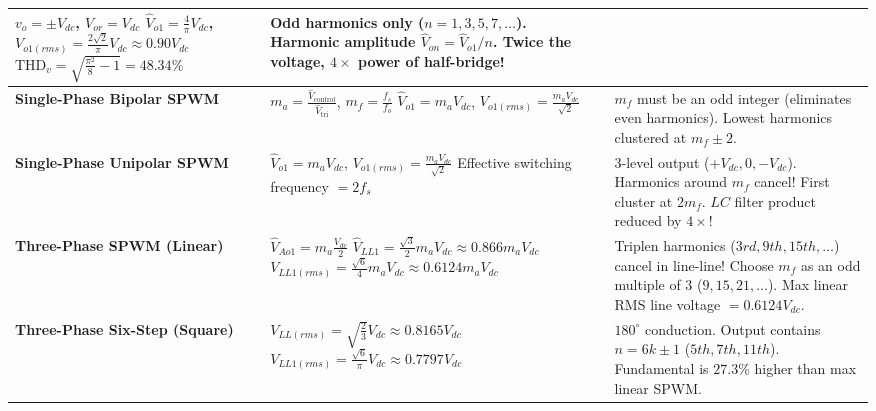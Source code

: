 \documentclass[11pt,a4paper]{article}
\begin{document}
\begin{table}[htbp]
\begin{tabularx}{\textwidth}{l p{5.5cm} X}
$v_o = \pm V_{dc}$, \quad $V_{or} = V_{dc}$ \newline
$\hat{V}_{o1} = \frac{4}{\pi}V_{dc}$, \quad $V_{o1(rms)} = \frac{2\sqrt{2}}{\pi}V_{dc} \approx 0.90 V_{dc}$ \newline
$\text{THD}_v = \sqrt{\frac{\pi^2}{8}-1} = 48.34\%$ &
Odd harmonics only ($n=1, 3, 5, 7, \dots$). \newline
Harmonic amplitude $\hat{V}_{on} = \hat{V}_{o1}/n$. \newline
Twice the voltage, $4\times$ power of half-bridge! \\
\midrule
\textbf{Single-Phase Bipolar SPWM} &
$m_a = \frac{\hat{V}_{\text{control}}}{\hat{V}_{\text{tri}}}$, \quad $m_f = \frac{f_s}{f_o}$ \newline
$\hat{V}_{o1} = m_a V_{dc}$, \quad $V_{o1(rms)} = \frac{m_a V_{dc}}{\sqrt{2}}$ &
$m_f$ must be an odd integer (eliminates even harmonics). \newline
Lowest harmonics clustered at $m_f \pm 2$. \\
\midrule
\textbf{Single-Phase Unipolar SPWM} &
$\hat{V}_{o1} = m_a V_{dc}$, \quad $V_{o1(rms)} = \frac{m_a V_{dc}}{\sqrt{2}}$ \newline
Effective switching frequency $= 2f_s$ &
3-level output ($+V_{dc}, 0, -V_{dc}$). \newline
Harmonics around $m_f$ cancel! First cluster at $2m_f$. \newline
$LC$ filter product reduced by $4\times$! \\
\midrule
\textbf{Three-Phase SPWM (Linear)} &
$\hat{V}_{Ao1} = m_a \frac{V_{dc}}{2}$ \newline
$\hat{V}_{LL1} = \frac{\sqrt{3}}{2} m_a V_{dc} \approx 0.866 m_a V_{dc}$ \newline
$V_{LL1(rms)} = \frac{\sqrt{6}}{4} m_a V_{dc} \approx 0.6124 m_a V_{dc}$ &
Triplen harmonics ($3rd, 9th, 15th, \dots$) cancel in line-line! \newline
Choose $m_f$ as an odd multiple of 3 ($9, 15, 21, \dots$). \newline
Max linear RMS line voltage $= 0.6124 V_{dc}$. \\
\midrule
\textbf{Three-Phase Six-Step (Square)} &
$V_{LL(rms)} = \sqrt{\frac{2}{3}}V_{dc} \approx 0.8165 V_{dc}$ \newline
$V_{LL1(rms)} = \frac{\sqrt{6}}{\pi}V_{dc} \approx 0.7797 V_{dc}$ &
$180^\circ$ conduction. Output contains $n=6k \pm 1$ ($5th, 7th, 11th$). \newline
Fundamental is $27.3\%$ higher than max linear SPWM. \\

\end{tabularx}
\end{table}
\end{document}
